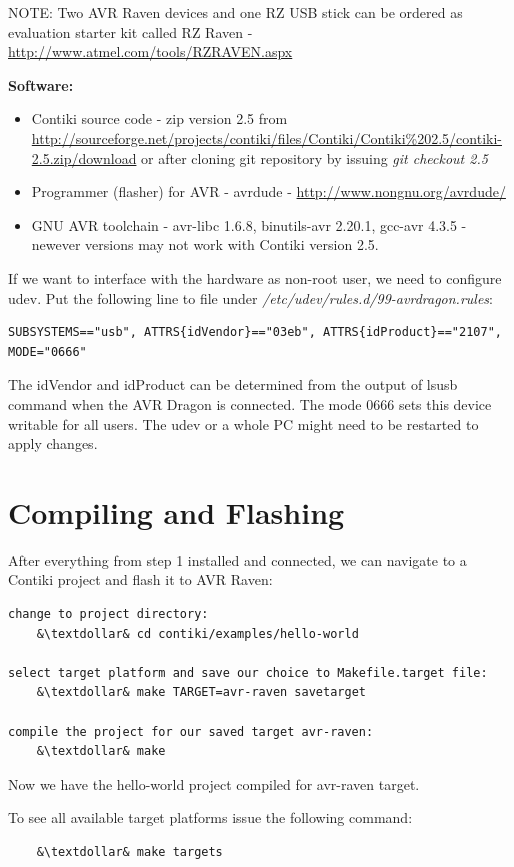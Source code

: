 \documentclass{article}
\begin{document}
NOTE: Two AVR Raven devices and one RZ USB stick can be ordered as
evaluation starter kit called RZ Raven - \url{http://www.atmel.com/tools/RZRAVEN.aspx}

\vspace{0.5cm}

{\textbf{Software:}}
\begin{itemize}
	\item Contiki source code - zip version 2.5 from\\
	\url{http://sourceforge.net/projects/contiki/files/Contiki/Contiki%202.5/contiki-2.5.zip/download}
	or after cloning git repository by issuing {\it{git checkout 2.5}}
	\item Programmer (flasher) for AVR - avrdude - \url{http://www.nongnu.org/avrdude/}
	\item GNU AVR toolchain - avr-libc 1.6.8, binutils-avr 2.20.1, gcc-avr 4.3.5 -
	newever versions may not work with Contiki version 2.5.
\end{itemize}

If we want to interface with the hardware as non-root user, we need to configure udev.
Put the following line to file under {\it{/etc/udev/rules.d/99-avrdragon.rules}}:
\begin{lstlisting}
SUBSYSTEMS=="usb", ATTRS{idVendor}=="03eb", ATTRS{idProduct}=="2107", MODE="0666"
\end{lstlisting}
The idVendor and idProduct can be determined from the output of lsusb command when the AVR Dragon is connected.
The mode 0666 sets this device writable for all users.
The udev or a whole PC might need to be restarted to apply changes.


\section{Compiling and Flashing}
After everything from step 1 installed and connected, we can navigate to a Contiki project and flash it to AVR Raven:
\begin{lstlisting}
change to project directory:
	&\textdollar& cd contiki/examples/hello-world

select target platform and save our choice to Makefile.target file:
	&\textdollar& make TARGET=avr-raven savetarget

compile the project for our saved target avr-raven:
	&\textdollar& make
\end{lstlisting}
Now we have the hello-world project compiled for avr-raven target.

To see all available target platforms issue the following command:
\begin{lstlisting}
	&\textdollar& make targets
\end{lstlisting}
\end{document}
